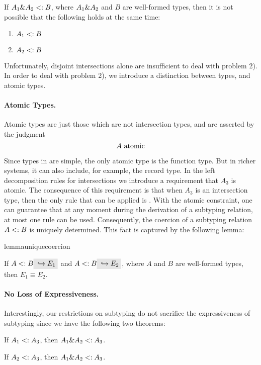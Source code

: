 \begin{lemma}
  \label{lemma:unique-subtype-contributor}

  If $A_1 \& A_2 <: B$, where $A_1 \& A_2$ and $B$ are well-formed types,
  then it is not possible that the following holds at the same time:
  \begin{enumerate}
    \item $A_1 <: B$
    \item $A_2 <: B$
  \end{enumerate}
\end{lemma}

Unfortunately, disjoint intersections alone are insufficient to deal with
problem 2). In order to deal with problem 2), we introduce a distinction between
types, and atomic types.

\paragraph{Atomic Types.} Atomic types are just those which are not intersection
types, and are asserted by the judgment \[ A \ \textnormal{atomic} \]

Since types in \name are simple, the only atomic type is the function type.
But in richer systems, it can also include, for example, the record type.
In the left decomposition rules for intersections we introduce a requirement
that $A_3$ is atomic. The consequence of this requirement is that when $A_3$ is
an intersection type, then the only rule that can be applied is
. With the atomic constraint, one can guarantee that at
any moment during the derivation of a subtyping relation, at most one rule can
be used. Consequently, the coercion of a subtyping relation $A <: B$ is
uniquely determined. This fact is captured by the following lemma:

\begin{restatable}{lemma}{uniquecoercion}
  \label{lemma:unique-coercion}

  If $A \subtype B \yields {E_1}$ and $A \subtype B \yields {E_2}$, where $A$
  and $B$ are well-formed types, then $E_1 \equiv E_2$.
\end{restatable}

\paragraph{No Loss of Expressiveness.}
Interestingly, our restrictions on subtyping do not sacrifice the expressiveness of
subtyping since we have the following two theorems:
\begin{theorem}
  If $A_1 <: A_3$, then $A_1 \& A_2 <: A_3$.
\end{theorem}
\begin{theorem}
If $A_2 <: A_3$, then $A_1 \& A_2 <: A_3$.
\end{theorem}

